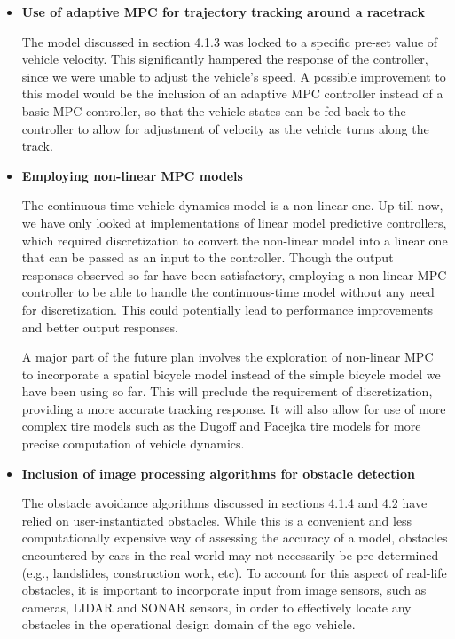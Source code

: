 \begin{itemize}
    \item \textbf{Use of adaptive MPC for trajectory tracking around a racetrack}

    The model discussed in section 4.1.3 was locked to a specific pre-set value of vehicle velocity. This significantly hampered the response of the controller, since we were unable to adjust the vehicle's speed. A possible improvement to this model would be the inclusion of an adaptive MPC controller instead of a basic MPC controller, so that the vehicle states can be fed back to the controller to allow for adjustment of velocity as the vehicle turns along the track.
    \item \textbf{Employing non-linear MPC models}

    The continuous-time vehicle dynamics model is a non-linear one. Up till now, we have only looked at implementations of linear model predictive controllers, which required discretization to convert the non-linear model into a linear one that can be passed as an input to the controller. Though the output responses observed so far have been satisfactory, employing a non-linear MPC controller to be able to handle the continuous-time model without any need for discretization. This could potentially lead to performance improvements and better output responses.

    A major part of the future plan involves the exploration of non-linear MPC to incorporate a spatial bicycle model instead of the simple bicycle model we have been using so far. This will preclude the requirement of discretization, providing a more accurate tracking response. It will also allow for use of more complex tire models such as the Dugoff and Pacejka tire models for more precise computation of vehicle dynamics. 
    \item \textbf{Inclusion of image processing algorithms for obstacle detection}

    The obstacle avoidance algorithms discussed in sections 4.1.4 and 4.2 have relied on user-instantiated obstacles. While this is a convenient and less computationally expensive way of assessing the accuracy of a model, obstacles encountered by cars in the real world may not necessarily be pre-determined (e.g., landslides, construction work, etc). To account for this aspect of real-life obstacles, it is important to incorporate input from image sensors, such as cameras, LIDAR and SONAR sensors, in order to effectively locate any obstacles in the operational design domain of the ego vehicle. 
    

\end{itemize}
